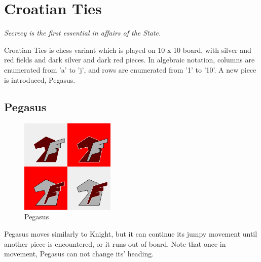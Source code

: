 \documentclass[a5paper,12pt,draft]{book} %
\begin{document}
\clearpage

\chapter*{Croatian Ties}

\begin{flushright}
\parbox{0.7\textwidth}{
\emph{Secrecy is the first essential in affairs of the State. \\
 } }
\end{flushright}

Croatian Ties is chess variant which is played on 10 x 10 board,
with silver and red fields and dark silver and dark red pieces.
In algebraic notation, columns are enumerated from 'a' to 'j',
and rows are enumerated from '1' to '10'. A new piece is
introduced, Pegasus.

\clearpage

\section*{Pegasus}

\noindent
\begin{figure}
\includegraphics[width=0.4\textwidth, keepaspectratio=true]{../gfx/pieces/07_pegasus.png}
\caption{Pegasus}
\label{fig:pegasus}
\end{figure}
\indent
Pegasus moves similarly to Knight, but it can continue its jumpy movement
until another piece is encountered, or it runs out of board. Note that once
in movement, Pegasus can not change its' heading.
\end{document}

